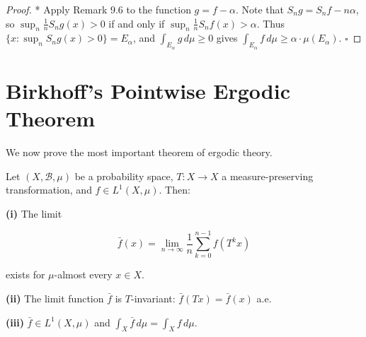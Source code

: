 \begin{proof}
* Apply Remark 9.6 to the function $g = f - \alpha$. Note that $S_n g = S_n f - n\alpha$, so $\sup_n \frac{1}{n} S_n g(x) > 0$ if and only if $\sup_n \frac{1}{n} S_n f(x) > \alpha$. Thus $\{x : \sup_n S_n g(x) > 0\} = E_\alpha$, and $\int_{E_\alpha} g \, d\mu \geq 0$ gives $\int_{E_\alpha} f \, d\mu \geq \alpha \cdot \mu(E_\alpha)$. $\square$


\end{proof}

\section{Birkhoff's Pointwise Ergodic Theorem}\label{sec:9.5}

We now prove the most important theorem of ergodic theory.

\begin{theorem}\label{thm:9.8}
Let $(X, \mathcal{B}, \mu)$ be a probability space, $T: X \to X$ a measure-preserving transformation, and $f \in L^1(X, \mu)$. Then:

\textbf{(i)} The limit

\[
\bar{f}(x) = \lim_{n \to \infty} \frac{1}{n} \sum_{k=0}^{n-1} f(T^k x)
\]

exists for $\mu$-almost every $x \in X$.

\textbf{(ii)} The limit function $\bar{f}$ is $T$-invariant: $\bar{f}(Tx) = \bar{f}(x)$ a.e.

\textbf{(iii)} $\bar{f} \in L^1(X, \mu)$ and $\int_X \bar{f} \, d\mu = \int_X f \, d\mu$.
\end{theorem}


